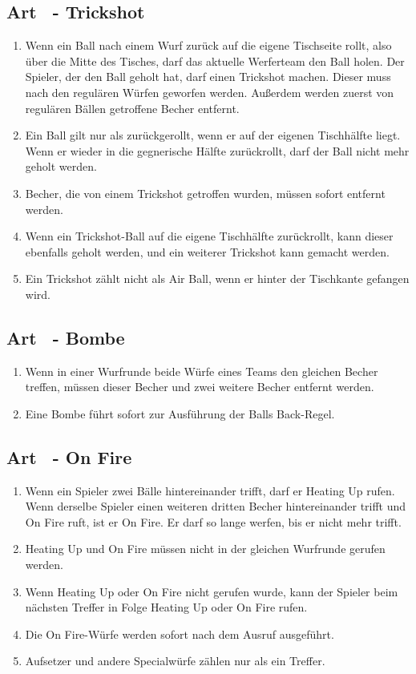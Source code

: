 \documentclass[a4paper,11pt]{scrartcl}
\newcommand{\enum}[1]{\begin{enumerate}[label=(\arabic*)]#1\end{enumerate}}
\newcommand{\art}[2]{\subsection*{#1} \enum{#2}}
\newcommand{\quot}[1]{\glqq #1\grqq}
\newcounter{art}
\begin{document}
    \art{Art \theart\ - \quot{Trickshot}}{
        \item
            Wenn ein Ball nach einem Wurf zurück auf die eigene Tischseite rollt, also über die Mitte des Tisches, darf das aktuelle Werferteam den Ball holen. Der Spieler, der den Ball geholt hat, darf einen \quot{Trickshot} machen. Dieser muss nach den regulären Würfen geworfen werden. Außerdem werden zuerst von regulären Bällen getroffene Becher entfernt.
        \item
            Ein Ball gilt nur als zurückgerollt, wenn er auf der eigenen Tischhälfte liegt. Wenn er wieder in die gegnerische Hälfte zurückrollt, darf der Ball nicht mehr geholt werden.
        \item
            Becher, die von einem \quot{Trickshot} getroffen wurden, müssen sofort entfernt werden.
        \item
            Wenn ein \quot{Trickshot}-Ball auf die eigene Tischhälfte zurückrollt, kann dieser ebenfalls geholt werden, und ein weiterer \quot{Trickshot} kann gemacht werden.
        \item
            Ein \quot{Trickshot} zählt nicht als \quot{Air Ball}, wenn er hinter der Tischkante gefangen wird.
    }

    \art{Art \theart\ - \quot{Bombe}}{
        \item
            Wenn in einer Wurfrunde beide Würfe eines Teams den gleichen Becher treffen, müssen dieser Becher und zwei weitere Becher entfernt werden.
        \item
            Eine \quot{Bombe} führt sofort zur Ausführung der \quot{Balls Back}-Regel.
    }

    \art{Art \theart\ - \quot{On Fire}}{
        \item
            Wenn ein Spieler zwei Bälle hintereinander trifft, darf er \quot{Heating Up} rufen. Wenn derselbe Spieler einen weiteren dritten Becher hintereinander trifft und \quot{On Fire} ruft, ist er \quot{On Fire}. Er darf so lange werfen, bis er nicht mehr trifft.
        \item
            \quot{Heating Up} und \quot{On Fire} müssen nicht in der gleichen Wurfrunde gerufen werden.
        \item
            Wenn \quot{Heating Up} oder \quot{On Fire} nicht gerufen wurde, kann der Spieler beim nächsten Treffer in Folge \quot{Heating Up} oder \quot{On Fire} rufen.
        \item
            Die \quot{On Fire}-Würfe werden sofort nach dem Ausruf ausgeführt.
        \item
            Aufsetzer und andere Specialwürfe zählen nur als ein Treffer.
    }
\end{document}
